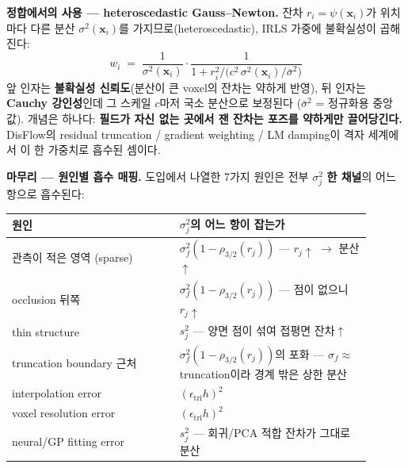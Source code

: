 \textbf{정합에서의 사용 --- heteroscedastic Gauss--Newton.} 잔차
$r_i = \psi(\mathbf{x}_i)$가 위치마다 다른 분산 $\sigma^2(\mathbf{x}_i)$를
가지므로(heteroscedastic), IRLS 가중에 불확실성이 곱해진다:
\begin{equation*}
  w_i \;=\; \frac{1}{\sigma^2(\mathbf{x}_i)} \cdot
  \frac{1}{1 + r_i^2 \big/ \big(c^2\,\sigma^2(\mathbf{x}_i)/\bar{\sigma}^2\big)}
\end{equation*}
앞 인자는 \textbf{불확실성 신뢰도}(분산이 큰 voxel의 잔차는 약하게 반영),
뒤 인자는 \textbf{Cauchy 강인성}인데 그 스케일 $c$마저 국소 분산으로
보정된다 ($\bar{\sigma}^2$ = 정규화용 중앙값). 개념은 하나다:
\textbf{필드가 자신 없는 곳에서 잰 잔차는 포즈를 약하게만 끌어당긴다.}
DisFlow의 residual truncation / gradient weighting / LM damping이 격자
세계에서 이 한 가중치로 흡수된 셈이다.

\textbf{마무리 --- 원인별 흡수 매핑.} 도입에서 나열한 7가지 원인은 전부
$\sigma_j^2$ \textbf{한 채널}의 어느 항으로 흡수된다:

\begin{longtable}{p{0.42\linewidth}p{0.48\linewidth}}
\toprule
\textbf{원인} & \textbf{$\sigma_j^2$의 어느 항이 잡는가} \\
\midrule
관측이 적은 영역 (sparse) & $\sigma_f^2(1-\rho_{3/2}(r_j))$ ---
  $r_j\uparrow$ $\to$ 분산$\uparrow$ \\
occlusion 뒤쪽 & $\sigma_f^2(1-\rho_{3/2}(r_j))$ --- 점이 없으니
  $r_j\uparrow$ \\
thin structure & $s_j^2$ --- 양면 점이 섞여 접평면 잔차$\uparrow$ \\
truncation boundary 근처 & $\sigma_f^2(1-\rho_{3/2}(r_j))$의 포화 ---
  $\sigma_f\approx$ truncation이라 경계 밖은 상한 분산 \\
interpolation error & $(\epsilon_{\text{tri}}h)^2$ \\
voxel resolution error & $(\epsilon_{\text{tri}}h)^2$ \\
neural/GP fitting error & $s_j^2$ --- 회귀/PCA 적합 잔차가 그대로 분산 \\
\bottomrule
\end{longtable}


